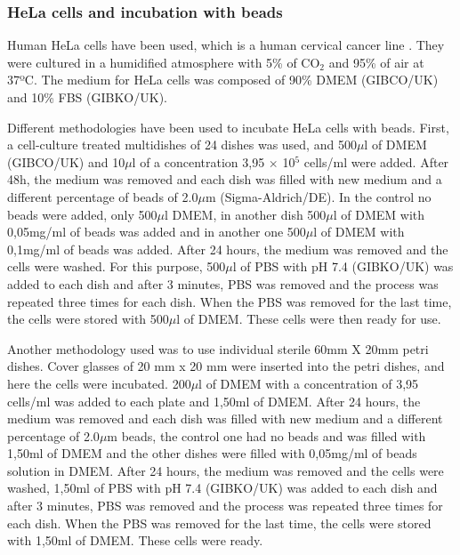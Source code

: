 \documentclass[12pt, a4paper]{article} %
\begin{document}
\setlength{\parskip}{0mm}

\subsubsection{HeLa cells and incubation with beads}

Human HeLa cells have been used, which is a human cervical cancer line \cite{gey1952tissue}. They were cultured in a humidified atmosphere with 5\% of CO$_{2}$ and 95\% of air at 37ºC. The medium for HeLa cells was composed of 90\% DMEM (GIBCO/UK) and 10\% FBS (GIBKO/UK).

\setlength{\parskip}{4mm}

Different methodologies have been used to incubate HeLa cells with beads. First, a cell-culture treated multidishes of 24 dishes was used, and 500$\mu$l of DMEM (GIBCO/UK) and 10$\mu$l of a concentration 3,95 $\times$ 10$^{5}$ cells/ml were added. After 48h, the medium was removed and each dish was filled with new medium and a different percentage of beads of 2.0$\mu$m (Sigma-Aldrich/DE). In the control no beads were added, only 500$\mu$l DMEM, in another dish 500$\mu$l of DMEM with 0,05mg/ml of beads was added and in another one 500$\mu$l of DMEM with 0,1mg/ml of beads was added. After 24 hours, the medium was removed and the cells were washed. For this purpose, 500$\mu$l of PBS with pH 7.4 (GIBKO/UK) was added to each dish and after 3 minutes, PBS was removed and the process was repeated three times for each dish. When the PBS was removed for the last time, the cells were stored with 500$\mu$l of DMEM. These cells were then ready for use. 

Another methodology used was to use individual sterile 60mm X 20mm petri dishes. Cover glasses of 20 mm x 20 mm were inserted into the petri dishes, and here the cells were incubated. 200$\mu$l of DMEM with a concentration of 3,95 cells/ml was added to each plate and 1,50ml of DMEM. After 24 hours, the medium was removed and each dish was filled with new medium and a different percentage of 2.0$\mu$m beads, the control one had no beads and was filled with 1,50ml of DMEM and the other dishes were filled with 0,05mg/ml of beads solution in DMEM. After 24 hours, the medium was removed and the cells were washed, 1,50ml of PBS with pH 7.4 (GIBKO/UK) was added to each dish and after 3 minutes, PBS was removed and the process was repeated three times for each dish. When the PBS was removed for the last time, the cells were stored with 1,50ml of DMEM. These cells were ready.
\end{document}
